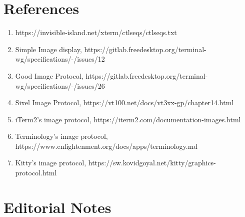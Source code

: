 \documentclass{article}
\begin{document}
\section{References} %

\begin{enumerate}
    \item \label{ref:ctlseqs}https://invisible-island.net/xterm/ctlseqs/ctlseqs.txt
    \item \label{ref:twg-simple-image-display}Simple Image display, https://gitlab.freedesktop.org/terminal-wg/specifications/-/issues/12
    \item \label{ref:twg-gip}Good Image Protocol, https://gitlab.freedesktop.org/terminal-wg/specifications/-/issues/26
    \item \label{ref:image-sixel}Sixel Image Protocol, https://vt100.net/docs/vt3xx-gp/chapter14.html
    \item \label{ref:image-item2}iTerm2's image protocol, https://iterm2.com/documentation-images.html
    \item \label{ref:image-terminology}Terminology's image protocol, https://www.enlightenment.org/docs/apps/terminology.md 
    \item \label{ref:image-kitty}Kitty's image protocol, https://sw.kovidgoyal.net/kitty/graphics-protocol.html
\end{enumerate}

\section{Editorial Notes}
\listoftodos
\end{document}
